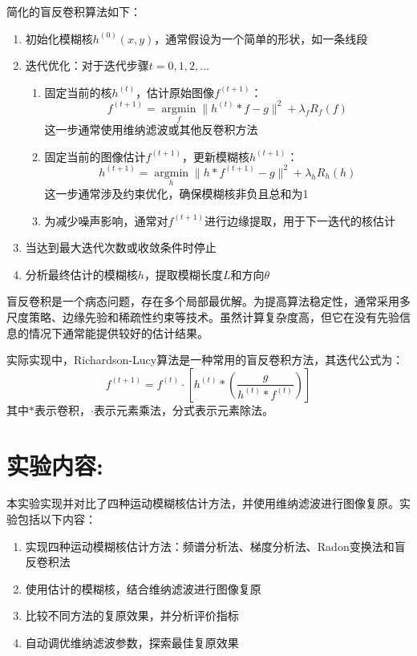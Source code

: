 \documentclass[a4paper,11pt,UTF8]{ctexart}
\begin{document}
简化的盲反卷积算法如下：
\begin{enumerate}
    \item 初始化模糊核$h^{(0)}(x,y)$，通常假设为一个简单的形状，如一条线段
    \item 迭代优化：对于迭代步骤$t = 0, 1, 2, ...$
    \begin{enumerate}
        \item 固定当前的核$h^{(t)}$，估计原始图像$f^{(t+1)}$：
        \begin{equation}
        f^{(t+1)} = \underset{f}{\operatorname{argmin}} \|h^{(t)} * f - g\|^2 + \lambda_f R_f(f)
        \end{equation}
        这一步通常使用维纳滤波或其他反卷积方法
        \item 固定当前的图像估计$f^{(t+1)}$，更新模糊核$h^{(t+1)}$：
        \begin{equation}
        h^{(t+1)} = \underset{h}{\operatorname{argmin}} \|h * f^{(t+1)} - g\|^2 + \lambda_h R_h(h)
        \end{equation}
        这一步通常涉及约束优化，确保模糊核非负且总和为1
        \item 为减少噪声影响，通常对$f^{(t+1)}$进行边缘提取，用于下一迭代的核估计
    \end{enumerate}
    \item 当达到最大迭代次数或收敛条件时停止
    \item 分析最终估计的模糊核$h$，提取模糊长度$L$和方向$\theta$
\end{enumerate}

盲反卷积是一个病态问题，存在多个局部最优解。为提高算法稳定性，通常采用多尺度策略、边缘先验和稀疏性约束等技术。虽然计算复杂度高，但它在没有先验信息的情况下通常能提供较好的估计结果。

实际实现中，Richardson-Lucy算法是一种常用的盲反卷积方法，其迭代公式为：
\begin{equation}
f^{(t+1)} = f^{(t)} \cdot \left[h^{(t)} * \left(\frac{g}{h^{(t)} * f^{(t)}}\right)\right]
\end{equation}
其中$*$表示卷积，$\cdot$表示元素乘法，分式表示元素除法。

\section{实验内容:}
本实验实现并对比了四种运动模糊核估计方法，并使用维纳滤波进行图像复原。实验包括以下内容：
\begin{enumerate}
    \item 实现四种运动模糊核估计方法：频谱分析法、梯度分析法、Radon变换法和盲反卷积法
    \item 使用估计的模糊核，结合维纳滤波进行图像复原
    \item 比较不同方法的复原效果，并分析评价指标
    \item 自动调优维纳滤波参数，探索最佳复原效果
\end{enumerate}
\end{document}
